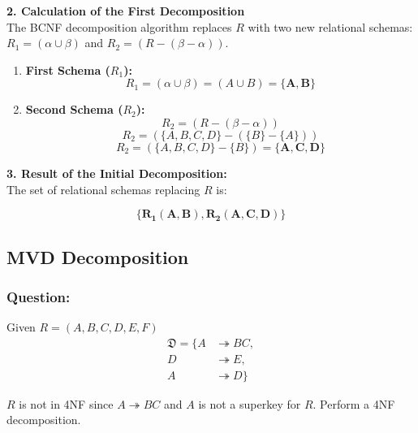 \documentclass{article}
\begin{document}
\textbf{2. Calculation of the First Decomposition} \\

The BCNF decomposition algorithm replaces $R$ with two new relational schemas: $R_1 = (\alpha \cup \beta)$ and $R_2 = (R - (\beta - \alpha))$.

\begin{enumerate}
    \item \textbf{First Schema ($R_1$):}
    $$R_1 = (\alpha \cup \beta) = (A \cup B) = \mathbf{\{A, B\}}$$

    \item \textbf{Second Schema ($R_2$):}
    $$R_2 = (R - (\beta - \alpha))$$
    $$R_2 = (\{A, B, C, D\} - (\{B\} - \{A\}))$$
    $$R_2 = (\{A, B, C, D\} - \{B\}) = \mathbf{\{A, C, D\}}$$
\end{enumerate}

\textbf{3. Result of the Initial Decomposition:} \\

The set of relational schemas replacing $R$ is:

$$\mathbf{\{R_1(A, B), R_2(A, C, D)\}}$$

\subsection{MVD Decomposition}

\subsubsection*{Question:}
Given $R = (A, B, C, D, E, F)$ \\

\begin{equation*}
    \begin{align*}
        \mathfrak{D} = \{ A &\twoheadrightarrow BC, \\
                D &\twoheadrightarrow E, \\
                A &\twoheadrightarrow D \}
    \end{align*}
\end{equation*}

$R$ is not in 4NF since $A \twoheadrightarrow BC$ and $A$ is not a superkey for $R$. Perform a 4NF decomposition.
\end{document}
